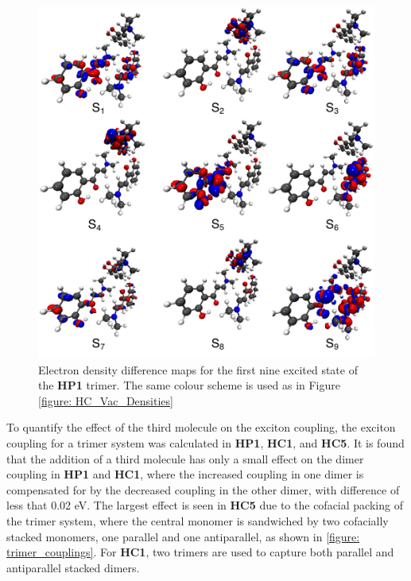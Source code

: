 \begin{figure}[t]
\centering
  \includegraphics[width=0.8\linewidth]{5ConnectingCrystalStructure/trimer_excitations}
  \caption[Electron density difference maps for the first nine excited state of the \textbf{HP1} trimer.]{Electron density difference maps for the first nine excited state of the \textbf{HP1} trimer. The same colour scheme is used as in Figure \ref{figure: HC_Vac_Densities}}
  \label{figure: trimer_excitations}
\end{figure} 

To quantify the effect of the third molecule on the exciton coupling, the exciton coupling for a trimer system was calculated in \textbf{HP1}, \textbf{HC1}, and \textbf{HC5}. It is found that the addition of a third molecule has only a small effect on the dimer coupling in \textbf{HP1} and \textbf{HC1}, where the increased coupling in one dimer is compensated for by the decreased coupling in the other dimer, with difference of less that 0.02 eV. The largest effect is seen in \textbf{HC5} due to the cofacial packing of the trimer system, where the central monomer is sandwiched by two cofacially stacked monomers, one parallel and one antiparallel, as shown in \ref{figure: trimer_couplings}. For \textbf{HC1}, two trimers are used to capture both parallel and antiparallel stacked dimers. 

